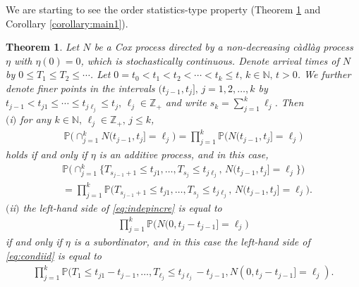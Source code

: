 \documentclass[11pt,leqno%
]{amsart}
\newtheorem{theorem}[lemma]{Theorem}
\newcommand{\N}{\mathbb{N}}
\newcommand{\Z }{{\mathbb Z}}
\renewcommand{\P }{{\mathbb P}}
\newcommand{\1}{{\mathbf 1}}
\begin{document}
We are starting to see the order
statistics-type property (Theorem \ref{thm:main1} and Corollary
\ref{corollary:main1}). 
 

\begin{theorem}
\label{thm:main1}
 Let $N$ be a Cox process directed by a non-decreasing c\`adl\`ag
 process $\eta$ with $\eta(0)=0$, which is stochastically continuous. 
 Denote arrival times of $N$ by $0\le T_1 \le
 T_2 \le \cdots$. Let $0=t_0<t_1<t_2<\cdots< t_k \le t,\,k\in\N,\,t>0$. We
 further denote finer points in the intervals $(t_{j-1},t_j],\,j=1,2,\ldots,k$
 by %
 $t_{j-1}<t_{j1}\le \cdots \le t_{j\ell_j} \le t_j,\,\ell_j\in\Z_+$
 and write 
 $s_k=\sum_{j=1}^k \ell_j$. Then \\
 $($i$)$ for any $k\in \N,\,\ell_j\in \Z_+,\,j\le k$,
 \begin{align}
 \label{eq:indepincre}
  \P\big( \cap_{j=1}^k N(t_{j-1},t_j]=\ell_j \big) = \prod_{j=1}^k
  \P\big(
 N(t_{j-1},t_j] =\ell_j
 \big)
 \end{align}
 holds if and only if $\eta$ is an additive process, and in this case,  
\begin{align}
& \P\big(
\cap^k_{j=1}\{T_{s_{j-1}+1} \le t_{j1},\ldots,T_{s_j} \le
t_{j\ell_j} 
,\,N(t_{j-1},t_j]=\ell_j \}
\big) \nonumber \\
 & = \prod_{j=1}^k \P \big(
T_{s_{j-1}+1}\le t_{j1},%
\ldots,T_{s_j}\le
 t_{j\ell_j},\,N(t_{j-1},t_j] =\ell_j 
\big). \label{eq:condiid}
\end{align}
$($ii$)$ the left-hand side of \eqref{eq:indepincre} is equal to 
\begin{align} \label{eq:stationary}
 \prod_{j=1}^k \P\big(
 N(0,t_j-t_{j-1}]=\ell_j
\big)
\end{align}
if and only if $\eta$ is a subordinator, and in this case the left-hand
 side of \eqref{eq:condiid} is equal to 
\begin{align}
\label{eq:condiidlv}
 \prod_{j=1}^k \P ( T_1\le t_{j1}-t_{j-1},%
 \ldots, T_{\ell_j}\le
 t_{j\ell_j}-t_{j-1},N(0,t_j-t_{j-1}]=\ell_j).  
\end{align}
\end{theorem}
\end{document}
